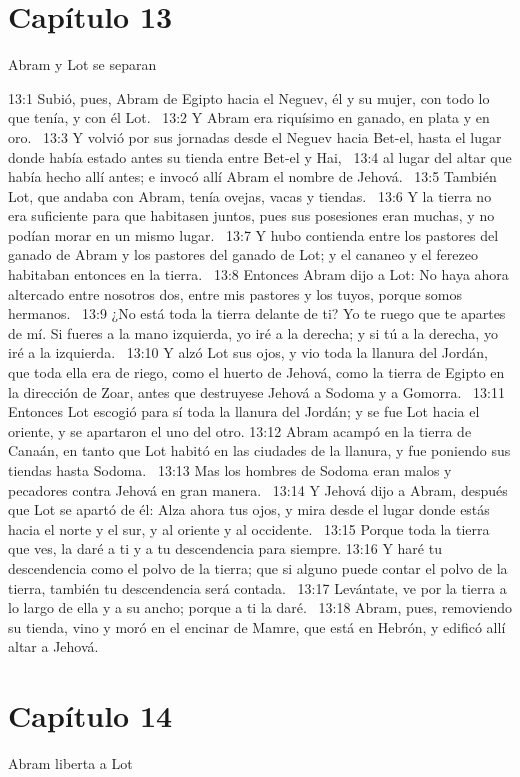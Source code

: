 \section*{Capítulo 13}
Abram y Lot se separan  

13:1 Subió, pues, Abram de Egipto hacia el Neguev, él y su mujer, con todo lo que tenía, y con él Lot.  
13:2 Y Abram era riquísimo en ganado, en plata y en oro.  
13:3 Y volvió por sus jornadas desde el Neguev hacia Bet-el, hasta el lugar donde había estado antes su tienda entre Bet-el y Hai,  
13:4 al lugar del altar que había hecho allí antes; e invocó allí Abram el nombre de Jehová.  
13:5 También Lot, que andaba con Abram, tenía ovejas, vacas y tiendas.  
13:6 Y la tierra no era suficiente para que habitasen juntos, pues sus posesiones eran muchas, y no podían morar en un mismo lugar.  
13:7 Y hubo contienda entre los pastores del ganado de Abram y los pastores del ganado de Lot; y el cananeo y el ferezeo habitaban entonces en la tierra.  
13:8 Entonces Abram dijo a Lot: No haya ahora altercado entre nosotros dos, entre mis pastores y los tuyos, porque somos hermanos.  
13:9 ¿No está toda la tierra delante de ti? Yo te ruego que te apartes de mí. Si fueres a la mano izquierda, yo iré a la derecha; y si tú a la derecha, yo iré a la izquierda.  
13:10 Y alzó Lot sus ojos, y vio toda la llanura del Jordán, que toda ella era de riego, como el huerto de Jehová, como la tierra de Egipto en la dirección de Zoar, antes que destruyese Jehová a Sodoma y a Gomorra.  
13:11 Entonces Lot escogió para sí toda la llanura del Jordán; y se fue Lot hacia el oriente, y se apartaron el uno del otro. 
13:12 Abram acampó en la tierra de Canaán, en tanto que Lot habitó en las ciudades de la llanura, y fue poniendo sus tiendas hasta Sodoma.  
13:13 Mas los hombres de Sodoma eran malos y pecadores contra Jehová en gran manera.  
13:14 Y Jehová dijo a Abram, después que Lot se apartó de él: Alza ahora tus ojos, y mira desde el lugar donde estás hacia el norte y el sur, y al oriente y al occidente.  
13:15 Porque toda la tierra que ves, la daré a ti y a tu descendencia para siempre. 
13:16 Y haré tu descendencia como el polvo de la tierra; que si alguno puede contar el polvo de la tierra, también tu descendencia será contada.  
13:17 Levántate, ve por la tierra a lo largo de ella y a su ancho; porque a ti la daré.  
13:18 Abram, pues, removiendo su tienda, vino y moró en el encinar de Mamre, que está en Hebrón, y edificó allí altar a Jehová.  
\section*{Capítulo 14}
Abram liberta a Lot  

